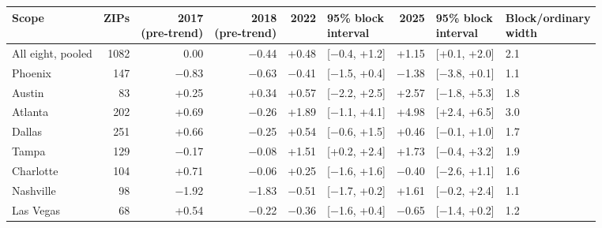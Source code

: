 \footnotesize\setlength{\tabcolsep}{4pt}
\begin{tabular}{lrrrrlrll}
\toprule
Scope & ZIPs & \shortstack[r]{2017\\(pre-trend)} & \shortstack[r]{2018\\(pre-trend)} & 2022 & \shortstack[r]{95\% block\\interval} & 2025 & \shortstack[r]{95\% block\\interval} & \shortstack[r]{Block/ordinary\\width} \\
\midrule
All eight, pooled & 1082 & 0.00 & $-$0.44 & +0.48 & [$-$0.4, +1.2] & +1.15 & [+0.1, +2.0] & 2.1 \\
Phoenix & 147 & $-$0.83 & $-$0.63 & $-$0.41 & [$-$1.5, +0.4] & $-$1.38 & [$-$3.8, +0.1] & 1.1 \\
Austin & 83 & +0.25 & +0.34 & +0.57 & [$-$2.2, +2.5] & +2.57 & [$-$1.8, +5.3] & 1.8 \\
Atlanta & 202 & +0.69 & $-$0.26 & +1.89 & [$-$1.1, +4.1] & +4.98 & [+2.4, +6.5] & 3.0 \\
Dallas & 251 & +0.66 & $-$0.25 & +0.54 & [$-$0.6, +1.5] & +0.46 & [$-$0.1, +1.0] & 1.7 \\
Tampa & 129 & $-$0.17 & $-$0.08 & +1.51 & [+0.2, +2.4] & +1.73 & [$-$0.4, +3.2] & 1.9 \\
Charlotte & 104 & +0.71 & $-$0.06 & +0.25 & [$-$1.6, +1.6] & $-$0.40 & [$-$2.6, +1.1] & 1.6 \\
Nashville & 98 & $-$1.92 & $-$1.83 & $-$0.51 & [$-$1.7, +0.2] & +1.61 & [$-$0.2, +2.4] & 1.1 \\
Las Vegas & 68 & +0.54 & $-$0.22 & $-$0.36 & [$-$1.6, +0.4] & $-$0.65 & [$-$1.4, +0.2] & 1.2 \\
\bottomrule
\end{tabular}
